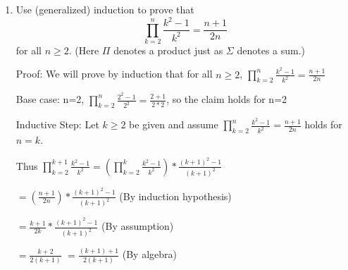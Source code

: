 \documentclass{article}
\newcommand{\bN}{\mathbb{N}}
\begin{document}
{\begin{enumerate}[labelindent=0pt,leftmargin=0pt]
\begin{enumerate}
    In both cases, if $n \in A \cup B$, then $n+1 \in A \cup B$. Therefore, $A \cup B$ is inductive.


    \item $A\cap B$ is inductive.
    
    Let $A={1,3,5,\ldots}$ and $B={2,4,6,\ldots}$. 
    Then $A\cap B=\emptyset$, which is not inductive since it does not contain $1$. 
    Therefore, $A\cap B$ is not intductive. 


    \item $A-B$ is inductive.
   
    Let $A = \bN$ and $B = {1}$. Both $A$ and $B$ are inductive subsets of $\mathbb{N}$. 
    
    Therefore, $A - B = \bN - \{1\} = \{2,3,4,\ldots\}$:

    In this case, $A - B$ does not contain $1$. Therefore, $A - B$ is not inductive.


    \item $A-B$ is not inductive.
   
    Let $A={1,3,5,\ldots}$ and $B={2,4,6,\ldots}$. Both $A$ and $B$ are inductive subsets of $\mathbb{N}$. 
    
    Then $A-B={1,3,5,\ldots}$, which is inductive. 


    \end{enumerate}


    \item Use (generalized) induction to prove that $$\prod_{k=2}^n\frac{k^2-1}{k^2}=\frac{n+1}{2n}$$ for all $n\geq 2$. (Here $\Pi$ denotes a product just as $\Sigma$ denotes a sum.)


    Proof: We will prove by induction that for all $n\geq 2$, $\prod_{k=2}^n\frac{k^2-1}{k^2}=\frac{n+1}{2n}$
    
    Base case: n=2, $\prod_{k=2}^n\frac{2^2-1}{2^2}=\frac{2+1}{2*2}$, so the claim holds for n=2
    
    Inductive Step: Let $k \geq 2$ be given and assume $\prod_{k=2}^n\frac{k^2-1}{k^2}=\frac{n+1}{2n}$ holds for $n=k$.
    

    Thus $\prod_{k=2}^{k+1}\frac{k^2-1}{k^2}=(\prod_{k=2}^k\frac{k^2-1}{k^2}) * \frac{(k+1)^2-1}{(k+1)^2}$ 
   
    $=(\frac{n+1}{2n}) * \frac{(k+1)^2-1}{(k+1)^2}$ (By induction hypothesis)

    $=\frac{k+1}{2k} * \frac{(k+1)^2-1}{(k+1)^2}$ (By assumption) 

    $=\frac{k+2}{2(k+1)}$ $=\frac{(k+1)+1}{2(k+1)}$ (By algebra)


\end{enumerate}}
\end{document}
